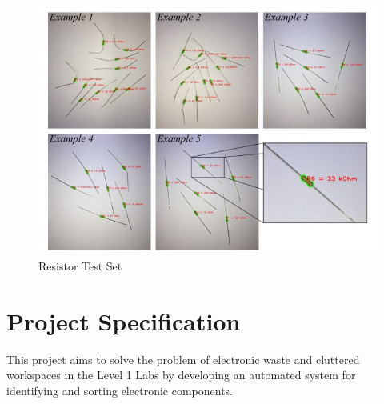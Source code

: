 \begin{figure}[t]
\begin{minipage}[t]{0.33\textwidth}
    \includegraphics[width=\textwidth]{imgs/articles/resistordata.jpg}
    \caption{Resistor Test Set\cite{8939034}}
    \label{fig:resistordata}
  \end{minipage}
\end{figure}

\section{Project Specification}
This project aims to solve the problem of electronic waste and cluttered workspaces in the Level 1 Labs
by developing an automated system for identifying and sorting electronic components.

